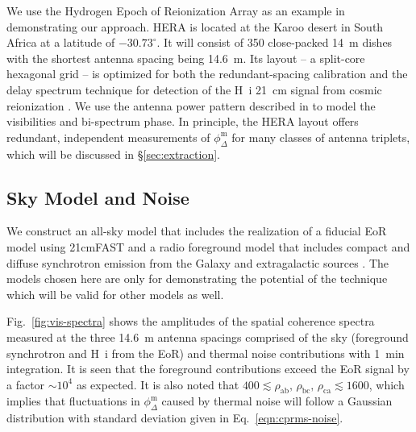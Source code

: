 \documentclass[
reprint,
superscriptaddress,
amsmath,
amssymb,
aps,
prd
]{revtex4-1}
\begin{document}
We use the Hydrogen Epoch of Reionization Array \cite[HERA;][]{deb17,thy16,ewa16,neb16,patra17} as an example in demonstrating our approach. HERA is located at the Karoo desert in South Africa at a latitude of $-30.73^\circ$. It will consist of 350 close-packed 14~m dishes with the shortest antenna spacing being 14.6~m. Its layout -- a split-core hexagonal grid -- is optimized for both the redundant-spacing calibration and the delay spectrum technique for detection of the H~{\sc i} 21~cm signal from cosmic reionization \cite{dil16}. We use the antenna power pattern described in \cite{deb17} to model the visibilities and bi-spectrum phase. In principle, the HERA layout offers redundant, independent measurements of $\phi_\Delta^\textrm{m}$ for many classes of antenna triplets, which will be discussed in \S\ref{sec:extraction}.

\subsection{Sky Model and Noise}\label{sec:skymodel-noise}

We construct an all-sky model that includes the realization of a fiducial EoR model using 21cmFAST \cite{mes11} and a radio foreground model that includes compact and diffuse synchrotron emission from the Galaxy and extragalactic sources \cite{thy15a}. The models chosen here are only for demonstrating the potential of the technique which will be valid for other models as well.

Fig.~\ref{fig:vis-spectra} shows the amplitudes of the spatial coherence spectra measured at the three 14.6~m antenna spacings comprised of the sky (foreground synchrotron and H~{\sc i} from the EoR) and thermal noise contributions with 1~min integration. It is seen that the foreground contributions exceed the EoR signal by a factor $\sim 10^4$ as expected. It is also noted that $400\lesssim \rho_\textrm{ab},\,\rho_\textrm{bc},\,\rho_\textrm{ca} \lesssim 1600$, which implies that fluctuations in $\phi_\Delta^\textrm{m}$ caused by thermal noise will follow a Gaussian distribution with standard deviation given in Eq.~\ref{eqn:cprms-noise}.
\end{document}
